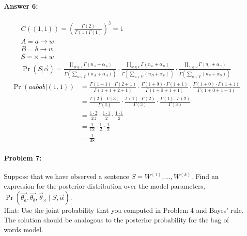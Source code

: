 \documentclass[12pt, letterpaper]{article}
\begin{document}
\paragraph{Answer 6:}\begin{gather*}
    C((1,1)) = \left(\frac{\Gamma (2)}{\Gamma (1) \Gamma (1)} \right)^3 = 1\\
    A = a\rightarrow w\\
    B = b \rightarrow w\\
    S = \rtimes \rightarrow w\\
    \Pr(S|\vec{\alpha}) =
    \frac{\prod_{w \in V} \Gamma(n_A+\alpha_{A})}{\Gamma(\sum_{w\in V} (n_A+\alpha_{A}))}\cdot{
    \frac{\prod_{w \in V} \Gamma(n_B+\alpha_{B})}{\Gamma(\sum_{w \in V} (n_B+\alpha_{B}))}\cdot{
    \frac{\prod_{w \in V} \Gamma(n_S+\alpha_{S})}{\Gamma(\sum_{w \in V} (n_S+\alpha_{S}))}}}
\end{gather*}
\begin{align*}
    \Pr(aabab|(1,1)) &= 
    \frac{\Gamma(1 + 1) \cdot{\Gamma(2 + 1)}}{\Gamma(1 + 1 + 2 + 1)}\cdot{
    \frac{\Gamma(1 + 0) \cdot{\Gamma(1 + 1)}}{\Gamma(1 + 0 + 1 + 1)}\cdot{
    \frac{\Gamma(1 + 0) \cdot{\Gamma(1 + 1)}}{\Gamma(1 + 0 + 1 + 1)}}}\\
    &= 
    \frac{\Gamma(2) \cdot{\Gamma(3)}}{\Gamma(5)}\cdot{
    \frac{\Gamma(1) \cdot{\Gamma(2)}}{\Gamma(3)}\cdot{
    \frac{\Gamma(1) \cdot{\Gamma(2)}}{\Gamma(3)}}}\\
    &= 
    \frac{1\cdot{2}}{24}\cdot{
    \frac{1\cdot{1}}{2}\cdot{
    \frac{1\cdot{1}}{2}}}\\
    &=
    \frac{1}{12}\cdot{
    \frac{1}{2}\cdot{
    \frac{1}{2}}}\\
    &= \frac{1}{48}
\end{align*}

\hrulefill
\paragraph{Problem 7:}

Suppose that we have observed a sentence
$S=W^{(1)},\dots,W^{(k)}$. Find an expression for the posterior
distribution over the model parameters,
$\Pr(\vec{\theta_a}, \vec{\theta_b}, \vec{\theta}_{\rtimes} \mid S,
\vec{\alpha})$.\\

\noindent Hint: Use the joint probability that you computed in Problem
4 and Bayes' rule. The solution should be analogous to the posterior
probability for the bag of words model.
\end{document}
